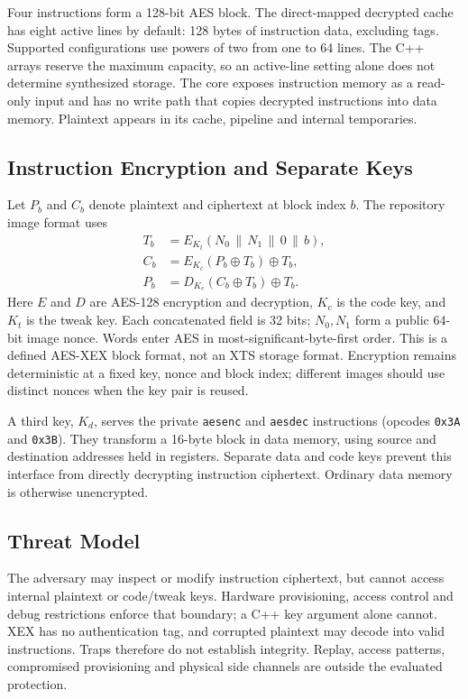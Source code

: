 \documentclass[conference,a4paper]{IEEEtran}
\begin{document}
Four instructions form a 128-bit AES block. The direct-mapped decrypted cache
has eight active lines by default: 128 bytes of instruction data, excluding
tags. Supported configurations use powers of two from one to 64 lines.
The C++ arrays reserve the maximum capacity, so an active-line setting alone
does not determine synthesized storage. The core exposes instruction memory
as a read-only input and has no write path that copies decrypted instructions
into data memory. Plaintext appears in its cache, pipeline and internal
temporaries.

\subsection{Instruction Encryption and Separate Keys}
Let $P_b$ and $C_b$ denote plaintext and ciphertext at block index $b$.
The repository image format uses
\begin{align}
  T_b &= E_{K_t}(N_0\,\|\,N_1\,\|\,0\,\|\,b), \\
  C_b &= E_{K_c}(P_b \oplus T_b) \oplus T_b, \\
  P_b &= D_{K_c}(C_b \oplus T_b) \oplus T_b.
\end{align}
Here $E$ and $D$ are AES-128 encryption and decryption, $K_c$ is the code key,
and $K_t$ is the tweak key. Each concatenated field is 32 bits; $N_0,N_1$
form a public 64-bit image nonce. Words enter AES in most-significant-byte-first
order. This is a defined AES-XEX block format, not an XTS storage format.
Encryption remains deterministic at a fixed key, nonce and block index;
different images should use distinct nonces when the key pair is reused.

A third key, $K_d$, serves the private \texttt{aesenc} and \texttt{aesdec}
instructions (opcodes \texttt{0x3A} and \texttt{0x3B}). They transform a 16-byte
block in data memory, using source and destination addresses held in registers.
Separate data and code keys prevent this interface from directly decrypting
instruction ciphertext. Ordinary data memory is otherwise unencrypted.

\subsection{Threat Model}
The adversary may inspect or modify instruction ciphertext, but cannot access
internal plaintext or code/tweak keys. Hardware provisioning, access control
and debug restrictions enforce that boundary; a C++ key argument alone cannot.
XEX has no authentication tag, and corrupted plaintext may decode into valid
instructions. Traps therefore do not establish integrity. Replay, access
patterns, compromised provisioning and physical side channels are outside the
evaluated protection.
\end{document}
